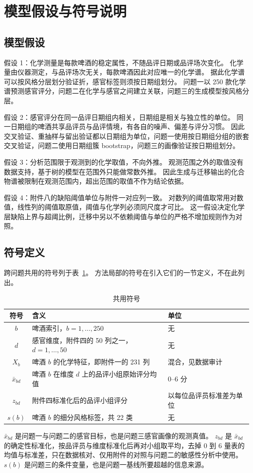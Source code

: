 \section{模型假设与符号说明}

\subsection{模型假设}

假设 1：化学测量是每款啤酒的稳定属性，不随品评日期或品评场次变化。
化学量由仪器测定，与品评场次无关，每款啤酒因此对应唯一的化学谱。
据此化学谱可以按风格分层划分验证折，感官标签则须按日期组划分。
问题一以 250 款化学谱预测感官评分，问题二在化学与感官之间建立关联，问题三的生成模型按风格分层。

假设 2：感官评分在同一品评日期组内相关，日期组是相关与独立性的单位。
同一日期组的啤酒共享品评员与品评情境，有各自的噪声、偏差与评分习惯。
因此交叉验证、重抽样与留出验证都以日期组为单位，问题一使用按日期组分组的嵌套交叉验证，问题二使用日期组簇 bootstrap，问题三的画像验证按日期组划分。

假设 3：分析范围限于观测到的化学取值，不向外推。
观测范围之外的取值没有数据支持，基于树的模型在范围外只能做常数外推。
因此生成与迁移输出的化合物谱被限制在观测范围内，超出范围的取值不作为结论依据。

假设 4：附件八的缺陷阈值单位与附件一对应列一致。
对数列的阈值取常用对数值，线性列的阈值取原值，阈值与化学列必须同尺度才可比。
这一假设决定化学层缺陷上界与超阈比例，迁移中另以不依赖阈值与单位的严格不增加规则作为对照。

\subsection{符号定义}

跨问题共用的符号列于表~\ref{tab:symbols}。
方法局部的符号在引入它们的一节定义，不在此列出。

\begin{table}[H]
\centering\small
\caption{共用符号}
\label{tab:symbols}
\begin{tabular}{cll}
\toprule
符号 & 含义 & 单位 \\
\midrule
$b$ & 啤酒索引，$b=1,\dots,250$ & 无 \\
$d$ & 感官维度，附件四的 50 列之一，$d=1,\dots,50$ & 无 \\
$X_b$ & 啤酒 $b$ 的化学特征，即附件一的 231 列 & 混合，见数据审计 \\
$\bar x_{bd}$ & 啤酒 $b$ 在维度 $d$ 上的品评小组原始评分均值 & 0--6 分 \\
$z_{bd}$ & 附件四标准化后的品评小组评分 & 以每位品评员标准差为单位 \\
$s(b)$ & 啤酒 $b$ 的细分风格标签，共 22 类 & 无 \\
\bottomrule
\end{tabular}
\end{table}

$\bar x_{bd}$ 是问题一与问题二的感官目标，也是问题三感官画像的观测真值。
$z_{bd}$ 是 $\bar x_{bd}$ 的确定性标准化，按品评员与维度标准化后再对小组取平均，去掉 0 到 6 量表的均值与标准差，只在数据核对、仅用附件的对照与问题二的敏感性分析中使用。
$s(b)$ 是问题三的条件变量，也是问题一基线所要超越的信息来源。
